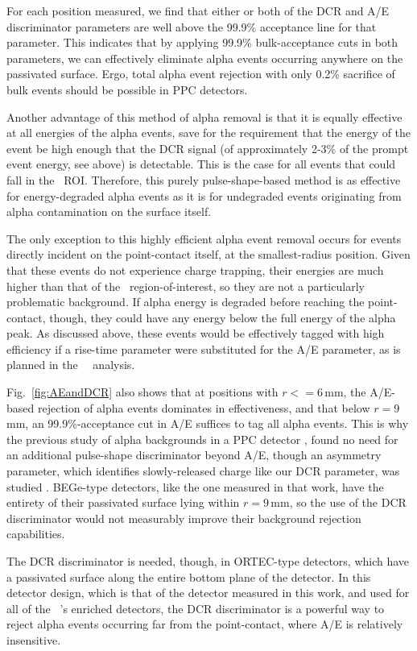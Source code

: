 For each position measured, we find that either or both of the DCR and A/E discriminator parameters are well above the 99.9\% acceptance line for that parameter. This indicates that by applying 99.9\% bulk-acceptance cuts in both parameters, we can effectively eliminate alpha events occurring anywhere on the passivated surface. Ergo, total alpha event rejection with only 0.2\% sacrifice of bulk events should be possible in PPC detectors.

Another advantage of this method of alpha removal is that it is equally effective at all energies of the alpha events, save for the requirement that the energy of the event be high enough that the DCR signal (of approximately 2-3\% of the prompt event energy, see above) is detectable. This is the case for all events that could fall in the \nonubb\ ROI. Therefore, this purely pulse-shape-based method is as effective for energy-degraded alpha events as it is for undegraded events originating from alpha contamination on the surface itself.

The only exception to this highly efficient alpha event removal occurs for events directly incident on the point-contact itself, at the smallest-radius position. Given that these events do not experience charge trapping, their energies are much higher than that of the \nonubb\ region-of-interest, so they are not a particularly problematic background. If alpha energy is degraded before reaching the point-contact, though, they could have any energy below the full energy of the alpha peak. As discussed above, these events would be effectively tagged with high efficiency if a rise-time parameter were substituted for the A/E parameter, as is planned in the \MJ\ \DEM\ analysis. 

Fig.~\ref{fig:AEandDCR} also shows that at positions with $r<= 6$\,mm, the A/E-based rejection of alpha events dominates in effectiveness, and that below $r=9$\,mm, an 99.9\%-acceptance cut in A/E suffices to tag all alpha events. This is why the previous study of alpha backgrounds in a PPC detector \cite{Agostini_thesis}, found no need for an additional pulse-shape discriminator beyond A/E, though an asymmetry parameter, which identifies slowly-released charge like our DCR parameter, was studied \cite{TUBEdoc?}. BEGe-type detectors, like the one measured in that work, have the entirety of their passivated surface lying within $r=9$\,mm, so the use of the DCR discriminator would not measurably improve their background rejection capabilities. 

The DCR discriminator is needed, though, in ORTEC-type detectors, which have a passivated surface along the entire bottom plane of the detector. In this detector design, which is that of the detector measured in this work, and used for all of the \MJ\ \DEM 's enriched detectors, the DCR discriminator is a powerful way to reject alpha events occurring far from the point-contact, where A/E is relatively insensitive. 

